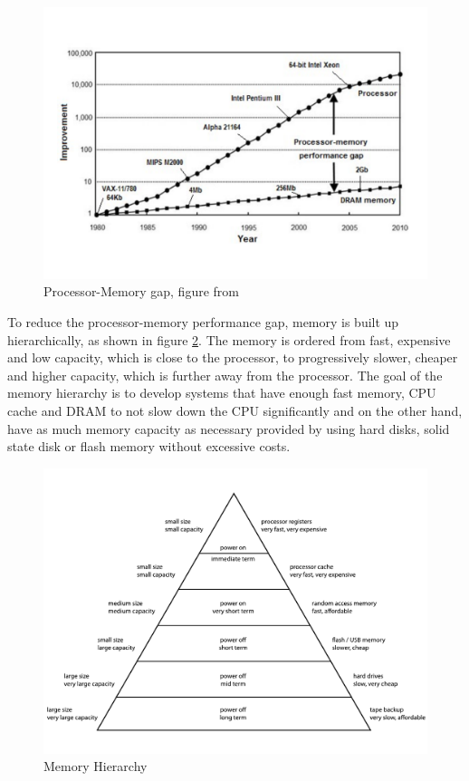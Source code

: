 \documentclass[
	12pt,
	a4paper,
	abstract,
	bibliography=totoc,
	chapterprefix,
	headings=openright,
	numbers=endperiod,
	parskip=half,
	twoside,
]{scrreprt}
\begin{document}
\begin{figure}[ht]
	\centering
	\includegraphics[scale=0.45]{processor_memory_gap.pdf}
	\caption{Processor-Memory gap, figure from \cite{cpu-mem-gap}}
		\label{fig:processor memory gap}
\end{figure}


To reduce the processor-memory performance gap, memory is built up hierarchically, as shown in figure \ref{fig:memory hierarchy}.
The memory is ordered from fast, expensive and low capacity, which is close to the processor, to progressively slower, cheaper and higher capacity, which is further away from the processor.
The goal of the memory hierarchy is to develop systems that have enough fast memory, CPU cache and DRAM to not slow down the CPU significantly and on the other hand, have as much memory capacity as necessary provided by using hard disks, solid state disk or flash memory without excessive costs.

\begin{figure}[ht]
	\centering
	\includegraphics[scale=0.6]{ComputerMemoryHierarchy.pdf}
	\caption{Memory Hierarchy}
		\label{fig:memory hierarchy}
\end{figure}
\end{document}
